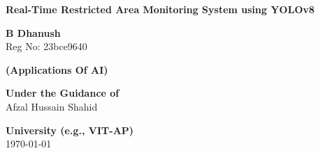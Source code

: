 \documentclass[12pt,a4paper]{article}
\begin{document}
\begin{titlepage}
	\centering
	\vspace*{2cm}
	
	\Huge
	\textbf{Real-Time Restricted Area Monitoring System using YOLOv8}
	
	\vspace{1.5cm}
	\Large
	\textbf{B Dhanush} \\
	Reg No: 23bce9640
	
	\vspace{1.5cm}
	\textbf{(Applications Of AI)}
	
	\vfill
	
	\large
	\textbf{Under the Guidance of}\\
	Afzal Hussain Shahid
	
	\vspace{1.5cm}
	
	\textbf{University (e.g., VIT-AP)}\\
	\today
	
\end{titlepage}

\newpage

\begin{abstract}
Security in sensitive areas has always been a concern, but relying solely on human guards or camera operators is not always reliable. People get tired, miss things, and cannot monitor everything at once. This project aims to solve that problem using Artificial Intelligence. We built a real-time monitoring system that uses YOLOv8, a fast and accurate object detection model, to watch a live camera feed and detect when a person or vehicle enters a restricted zone. When an intrusion is detected, the system immediately plays an audio alert and logs the event with a timestamp. The recorded data is displayed on a live dashboard built using Streamlit and FastAPI, making it easy to track and review incidents. The system runs continuously without needing a human to watch the screen, which makes it much more reliable for real-world security use cases.
\end{abstract}

\newpage
\end{document}
